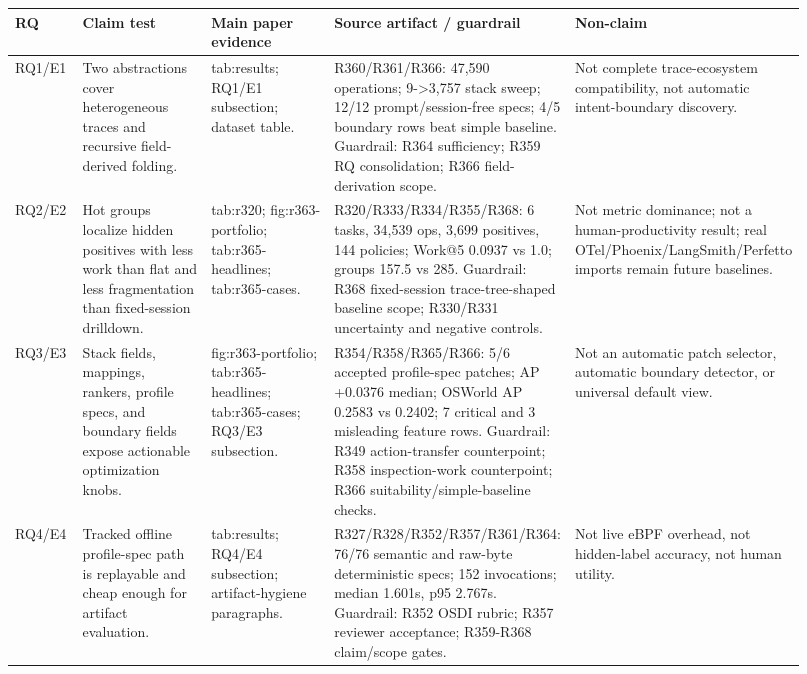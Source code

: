 \begin{tabular}{p{0.09\linewidth}p{0.22\linewidth}p{0.23\linewidth}p{0.22\linewidth}p{0.16\linewidth}}
  \toprule
  RQ & Claim test & Main paper evidence & Source artifact / guardrail & Non-claim \\
  \midrule
  RQ1/E1 & Two abstractions cover heterogeneous traces and recursive field-derived folding. & tab:results; RQ1/E1 subsection; dataset table. & R360/R361/R366: 47,590 operations; 9->3,757 stack sweep; 12/12 prompt/session-free specs; 4/5 boundary rows beat simple baseline. Guardrail: R364 sufficiency; R359 RQ consolidation; R366 field-derivation scope. & Not complete trace-ecosystem compatibility, not automatic intent-boundary discovery. \\
  RQ2/E2 & Hot groups localize hidden positives with less work than flat and less fragmentation than fixed-session drilldown. & tab:r320; fig:r363-portfolio; tab:r365-headlines; tab:r365-cases. & R320/R333/R334/R355/R368: 6 tasks, 34,539 ops, 3,699 positives, 144 policies; Work@5 0.0937 vs 1.0; groups 157.5 vs 285. Guardrail: R368 fixed-session trace-tree-shaped baseline scope; R330/R331 uncertainty and negative controls. & Not metric dominance; not a human-productivity result; real OTel/Phoenix/LangSmith/Perfetto imports remain future baselines. \\
  RQ3/E3 & Stack fields, mappings, rankers, profile specs, and boundary fields expose actionable optimization knobs. & fig:r363-portfolio; tab:r365-headlines; tab:r365-cases; RQ3/E3 subsection. & R354/R358/R365/R366: 5/6 accepted profile-spec patches; AP +0.0376 median; OSWorld AP 0.2583 vs 0.2402; 7 critical and 3 misleading feature rows. Guardrail: R349 action-transfer counterpoint; R358 inspection-work counterpoint; R366 suitability/simple-baseline checks. & Not an automatic patch selector, automatic boundary detector, or universal default view. \\
  RQ4/E4 & Tracked offline profile-spec path is replayable and cheap enough for artifact evaluation. & tab:results; RQ4/E4 subsection; artifact-hygiene paragraphs. & R327/R328/R352/R357/R361/R364: 76/76 semantic and raw-byte deterministic specs; 152 invocations; median 1.601s, p95 2.767s. Guardrail: R352 OSDI rubric; R357 reviewer acceptance; R359-R368 claim/scope gates. & Not live eBPF overhead, not hidden-label accuracy, not human utility. \\
  \bottomrule
\end{tabular}

